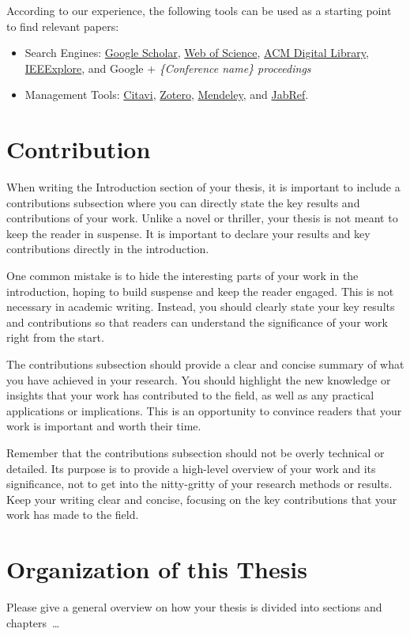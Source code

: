According to our experience, the following tools can be used as a starting point to find relevant papers:
\begin{itemize}
    \item Search Engines: \href{https://scholar.google.com}{Google Scholar}, \href{https://www.webofknowledge.com/}{Web of Science}, \href{https://dl.acm.org/}{ACM Digital Library}, \href{https://ieeexplore.ieee.org/Xplore/home.jsp}{IEEExplore}, and Google + \emph{\{Conference name\} proceedings}
    \item Management Tools: \href{https://www.it-services.ruhr-uni-bochum.de/services/software/citavi.html.de}{Citavi}, \href{https://www.zotero.org/}{Zotero}, \href{https://www.mendeley.com/}{Mendeley}, and \href{https://www.jabref.org/}{JabRef}.
\end{itemize}


\section{Contribution}

When writing the Introduction section of your thesis, it is important to include a contributions subsection where you can directly state the key results and contributions of your work. Unlike a novel or thriller, your thesis is not meant to keep the reader in suspense. It is important to declare your results and key contributions directly in the introduction.

One common mistake is to hide the interesting parts of your work in the introduction, hoping to build suspense and keep the reader engaged. This is not necessary in academic writing. Instead, you should clearly state your key results and contributions so that readers can understand the significance of your work right from the start.

The contributions subsection should provide a clear and concise summary of what you have achieved in your research. You should highlight the new knowledge or insights that your work has contributed to the field, as well as any practical applications or implications. This is an opportunity to convince readers that your work is important and worth their time.

Remember that the contributions subsection should not be overly technical or detailed. Its purpose is to provide a high-level overview of your work and its significance, not to get into the nitty-gritty of your research methods or results. Keep your writing clear and concise, focusing on the key contributions that your work has made to the field.

\section{Organization of this Thesis}
Please give a general overview on how your thesis is divided into sections and chapters~\dots

